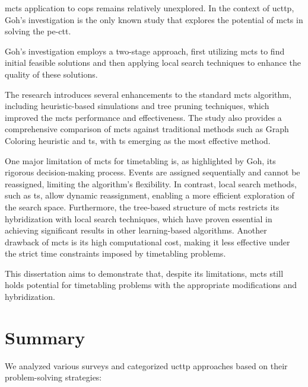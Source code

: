 \ac{mcts} application to \acp{cop} remains relatively unexplored. In the context of \ac{ucttp}, Goh's investigation \cite{goh_MCTS} is the only known study that explores the potential of \ac{mcts} in solving the \ac{pe-ctt}. 

Goh's investigation employs a two-stage approach, first utilizing \ac{mcts} to find initial feasible solutions and then applying local search techniques to enhance the quality of these solutions.

The research introduces several enhancements to the standard \ac{mcts} algorithm, including heuristic-based simulations and tree pruning techniques, which improved the \ac{mcts} performance and effectiveness. The study also provides a comprehensive comparison of \ac{mcts} against traditional methods such as Graph Coloring heuristic and \ac{ts}, with \ac{ts} emerging as the most effective method.

One major limitation of \ac{mcts} for timetabling is, as highlighted by Goh, its rigorous decision-making process. Events are assigned sequentially and cannot be reassigned, limiting the algorithm's flexibility. In contrast, local search methods, such as \ac{ts}, allow dynamic reassignment, enabling a more efficient exploration of the search space. Furthermore, the tree-based structure of \ac{mcts} restricts its hybridization with local search techniques, which have proven essential in achieving significant results in other learning-based algorithms. Another drawback of \ac{mcts} is its high computational cost, making it less effective under the strict time constraints imposed by timetabling problems.

This dissertation aims to demonstrate that, despite its limitations, \ac{mcts} still holds potential for timetabling problems with the appropriate modifications and hybridization. 

\section{Summary}

We analyzed various surveys \cite{lewis_survey_2008,abdipoor_meta-heuristic_2023,babaei_survey_2015,chen_survey_2021} and categorized \ac{ucttp} approaches based on their problem-solving strategies:

